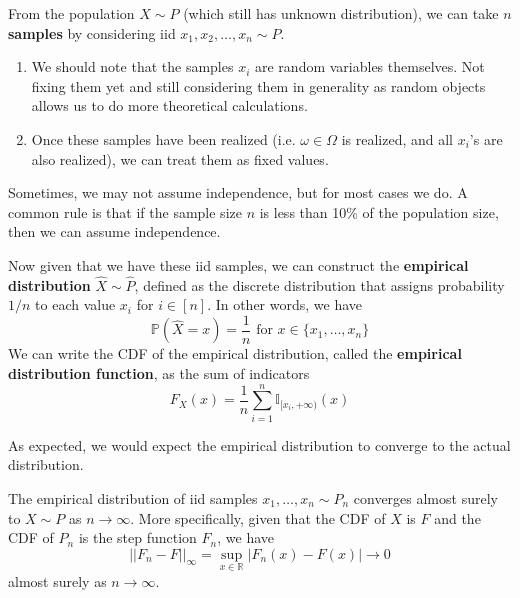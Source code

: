 \documentclass{article}
\begin{document}
    \begin{definition}[Samples]
      From the population $X \sim P$ (which still has unknown distribution), we can take $n$ \textbf{samples} by considering iid $x_1, x_2, \ldots, x_n \sim P$. 
      \begin{enumerate}
        \item We should note that the samples $x_i$ are random variables themselves. Not fixing them yet and still considering them in generality as random objects allows us to do more theoretical calculations. 
        \item Once these samples have been realized (i.e. $\omega \in \Omega$ is realized, and all $x_i$'s are also realized), we can treat them as fixed values. 
      \end{enumerate}
      Sometimes, we may not assume independence, but for most cases we do. A common rule is that if the sample size $n$ is less than 10\% of the population size, then we can assume independence. 
    \end{definition}

    \begin{definition}
      Now given that we have these iid samples, we can construct the \textbf{empirical distribution} $\widehat{X} \sim \widehat{P}$, defined as the discrete distribution that assigns probability $1/n$ to each value $x_i$ for $i \in [n]$. In other words, we have 
      \begin{equation}
        \mathbb{P}(\widehat{X} = x) = \frac{1}{n} \text{ for } x \in \{x_1, \ldots, x_n\}
      \end{equation}
      We can write the CDF of the empirical distribution, called the \textbf{empirical distribution function}, as the sum of indicators
      \begin{equation}
        F_X (x) = \frac{1}{n} \sum_{i=1}^n \mathbb{I}_{[x_i, +\infty)} (x)
      \end{equation}
    \end{definition}

    As expected, we would expect the empirical distribution to converge to the actual distribution. 

    \begin{theorem}
      The empirical distribution of iid samples $x_1, \ldots, x_n \sim P_n$ converges almost surely to $X \sim P$ as $n \rightarrow \infty$. More specifically, given that the CDF of $X$ is $F$ and the CDF of $P_n$ is the step function $F_n$, we have 
      \begin{equation}
        ||F_n - F||_{\infty} = \sup_{x \in \mathbb{R}} |F_n (x) - F(x)| \rightarrow 0
      \end{equation}
      almost surely as $n \rightarrow \infty$. 
    \end{theorem}
\end{document}
